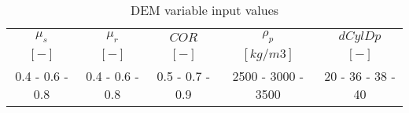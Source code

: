 \begin{table}[h]
\centering
\begin{tabular}{ccccc}
\hline
    $\mu_s$ & $\mu_r$ & $COR$ & $\rho_p$ & $dCylDp$ \\
    	$[-]$  & $[-]$   & $[-]$   & $[kg/m3]$ & $[-]$ \\
    \hline
    0.4 - 0.6 - 0.8 & 0.4 - 0.6 - 0.8 & 0.5 - 0.7 - 0.9 & 2500 - 3000 - 3500 & 20 - 36 - 38 - 40 \\

\hline
\end{tabular}
\caption{DEM variable input values}
\label{tab:10DEMVariableinputvalues}
\end{table}
